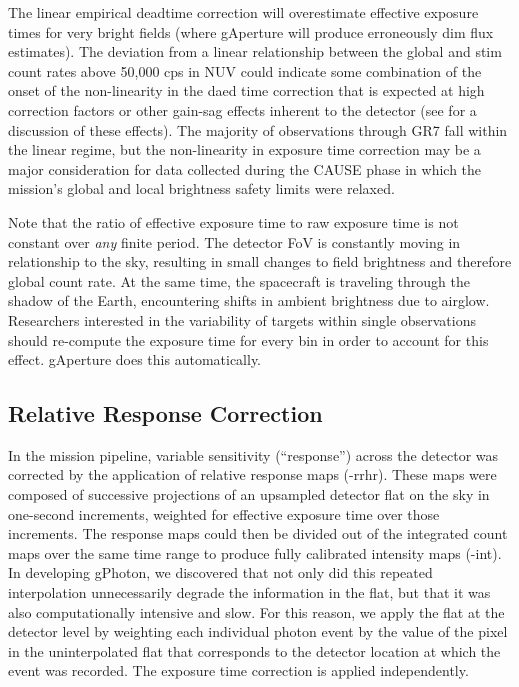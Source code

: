 \documentclass[preprint]{aastex}
\begin{document}
The linear empirical deadtime correction will overestimate effective exposure times for very bright fields (where gAperture will produce erroneously dim flux estimates). The deviation from a linear relationship between the global and stim count rates above 50,000 cps in NUV could indicate some combination of the onset of the non-linearity in the daed time correction that is expected at high correction factors or other gain-sag effects inherent to the detector (see \citep{mor2007} for a discussion of these effects). The majority of observations through GR7 fall within the linear regime, but the non-linearity in exposure time correction may be a major consideration for data collected during the CAUSE phase in which the mission's global and local brightness safety limits were relaxed.

Note that the ratio of effective exposure time to raw exposure time is not constant over \emph{any} finite period. The detector FoV is constantly moving in relationship to the sky, resulting in small changes to field brightness and therefore global count rate. At the same time, the spacecraft is traveling through the shadow of the Earth, encountering shifts in ambient brightness due to airglow. Researchers interested in the variability of targets within single observations should re-compute the exposure time for every bin in order to account for this effect. gAperture does this automatically.

\subsection{Relative Response Correction}
\label{relresponsecorr}
In the mission pipeline, variable sensitivity (``response'') across the detector was corrected by the application of relative response maps (-rrhr). These maps were composed of successive projections of an upsampled detector flat on the sky in one-second increments, weighted for effective exposure time over those increments. The response maps could then be divided out of the integrated count maps over the same time range to produce fully calibrated intensity maps (-int). In developing gPhoton, we discovered that not only did this repeated interpolation unnecessarily degrade the information in the flat, but that it was also computationally intensive and slow. For this reason, we apply the flat at the detector level by weighting each individual photon event by the value of the pixel in the uninterpolated flat that corresponds to the detector location at which the event was recorded. The exposure time correction is applied independently.
\end{document}
